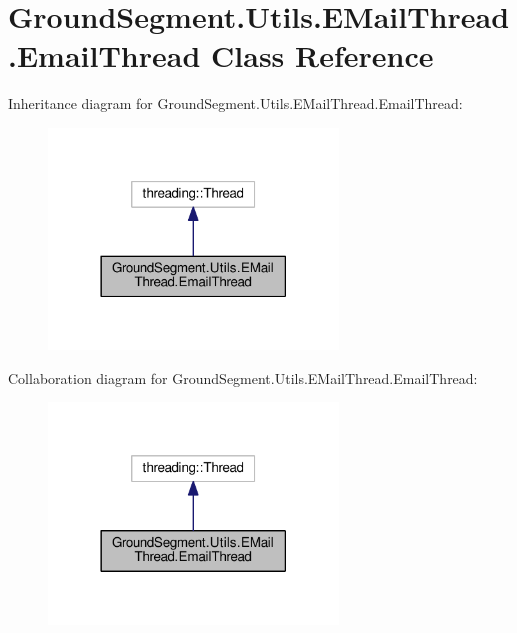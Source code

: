 \hypertarget{class_ground_segment_1_1_utils_1_1_e_mail_thread_1_1_email_thread}{}\section{Ground\+Segment.\+Utils.\+E\+Mail\+Thread.\+Email\+Thread Class Reference}
\label{class_ground_segment_1_1_utils_1_1_e_mail_thread_1_1_email_thread}


Inheritance diagram for Ground\+Segment.\+Utils.\+E\+Mail\+Thread.\+Email\+Thread\+:\nopagebreak
\begin{figure}[H]
\begin{center}
\leavevmode
\includegraphics[width=218pt]{class_ground_segment_1_1_utils_1_1_e_mail_thread_1_1_email_thread__inherit__graph}
\end{center}
\end{figure}


Collaboration diagram for Ground\+Segment.\+Utils.\+E\+Mail\+Thread.\+Email\+Thread\+:\nopagebreak
\begin{figure}[H]
\begin{center}
\leavevmode
\includegraphics[width=218pt]{class_ground_segment_1_1_utils_1_1_e_mail_thread_1_1_email_thread__coll__graph}
\end{center}
\end{figure}
